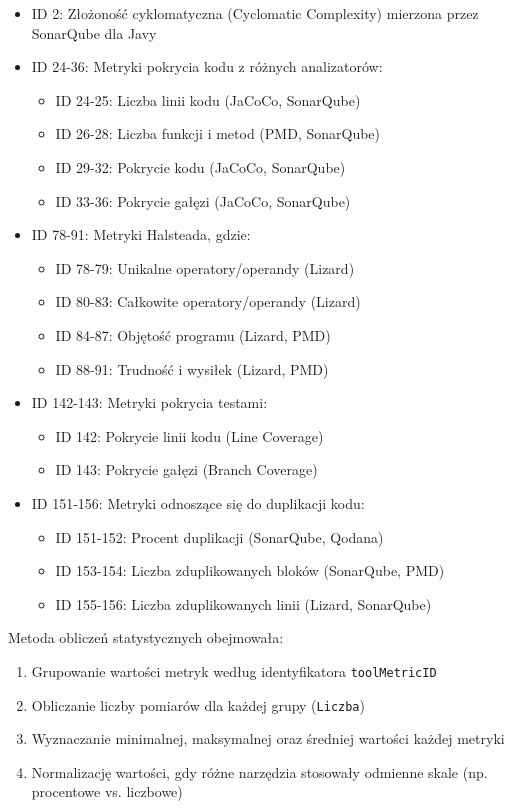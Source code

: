 \documentclass[a4paper,12pt]{article}
\begin{document}
\begin{itemize}
\item ID 2: Złożoność cyklomatyczna (Cyclomatic Complexity) mierzona przez SonarQube dla Javy
\item ID 24-36: Metryki pokrycia kodu z różnych analizatorów:
  \begin{itemize}
    \item ID 24-25: Liczba linii kodu (JaCoCo, SonarQube)
    \item ID 26-28: Liczba funkcji i metod (PMD, SonarQube)
    \item ID 29-32: Pokrycie kodu (JaCoCo, SonarQube)
    \item ID 33-36: Pokrycie gałęzi (JaCoCo, SonarQube)
  \end{itemize}
\item ID 78-91: Metryki Halsteada, gdzie:
  \begin{itemize}
    \item ID 78-79: Unikalne operatory/operandy (Lizard)
    \item ID 80-83: Całkowite operatory/operandy (Lizard)
    \item ID 84-87: Objętość programu (Lizard, PMD)
    \item ID 88-91: Trudność i wysiłek (Lizard, PMD)
  \end{itemize}
\item ID 142-143: Metryki pokrycia testami:
  \begin{itemize}
    \item ID 142: Pokrycie linii kodu (Line Coverage)
    \item ID 143: Pokrycie gałęzi (Branch Coverage)
  \end{itemize}
\item ID 151-156: Metryki odnoszące się do duplikacji kodu:
  \begin{itemize}
    \item ID 151-152: Procent duplikacji (SonarQube, Qodana)
    \item ID 153-154: Liczba zduplikowanych bloków (SonarQube, PMD)
    \item ID 155-156: Liczba zduplikowanych linii (Lizard, SonarQube)
  \end{itemize}
\end{itemize}

Metoda obliczeń statystycznych obejmowała:
\begin{enumerate}
\item Grupowanie wartości metryk według identyfikatora \texttt{toolMetricID}
\item Obliczanie liczby pomiarów dla każdej grupy (\texttt{Liczba})
\item Wyznaczanie minimalnej, maksymalnej oraz średniej wartości każdej metryki
\item Normalizację wartości, gdy różne narzędzia stosowały odmienne skale (np. procentowe vs. liczbowe)
\end{enumerate}
\end{document}
